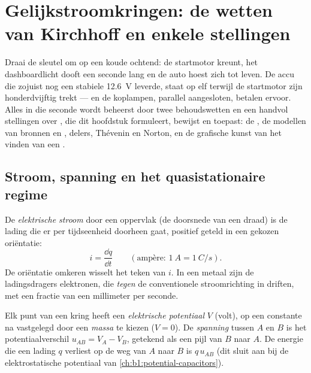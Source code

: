 \chapter{Gelijkstroomkringen: de wetten van Kirchhoff en enkele stellingen}\label{ch:b1:dc-circuits}

Draai de sleutel om op een koude ochtend: de startmotor kreunt, het
dashboardlicht dooft een seconde lang en de auto hoest zich tot leven. De accu
die zojuist nog een stabiele \qty{12.6}{V} leverde, staat op elf terwijl
de startmotor zijn honderdvijftig  trekt --- en de koplampen, parallel
aangesloten, betalen ervoor. Alles in die seconde wordt beheerst door
twee behoudswetten en een handvol stellingen over , die dit
hoofdstuk formuleert, bewijst en toepast: de , de
modellen van bronnen en , delers, Thévenin en Norton, en
de grafische kunst van het vinden van een .

\section{Stroom, spanning en het quasistationaire regime}

\begin{definition}\label{def:b1:dc-circuits:current}
De \emph{elektrische stroom} door een oppervlak (de doorsnede van een draad)
is de lading die er per tijdseenheid doorheen gaat, positief geteld in een
gekozen oriëntatie:
\[
i = \frac{\dd q}{\dd t} \qquad (\text{ampère: } \qty{1}{A} = \qty{1}{C/s}).
\]
De oriëntatie omkeren wisselt het teken van $i$. In een metaal zijn de
ladingsdragers elektronen, die \emph{tegen} de conventionele stroomrichting in
driften, met een fractie van een millimeter per seconde.
\end{definition}

\begin{definition}\label{def:b1:dc-circuits:voltage}
Elk punt van een kring heeft een \emph{elektrische potentiaal} $V$ (volt),
op een constante na vastgelegd door een \emph{massa} te kiezen ($V = 0$).
De \emph{spanning} tussen $A$ en $B$ is het potentiaalverschil
$u_{AB} = V_A - V_B$, getekend als een pijl van $B$ naar $A$. De energie die een
lading $q$ verliest op de weg van $A$ naar $B$ is $q\,u_{AB}$ (dit sluit aan
bij de elektrostatische potentiaal van \cref{ch:b1:potential-capacitors}).
\end{definition}

